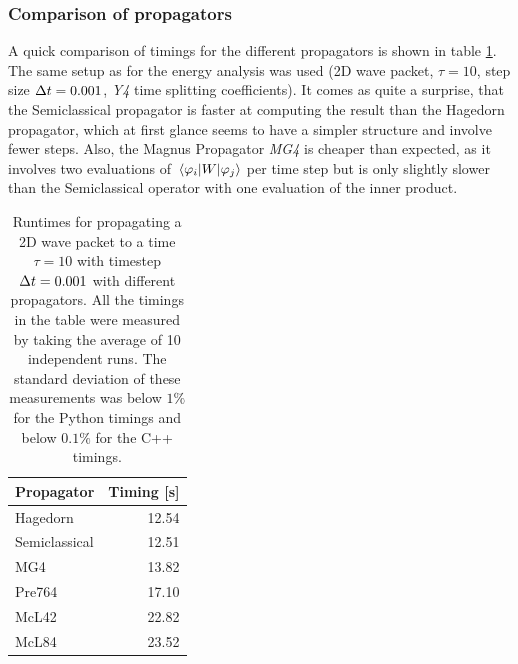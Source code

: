 \subsubsection{Comparison of propagators}
%
A quick comparison of timings for the different propagators is shown in table \ref{tab:comparison}.
The same setup as for the energy analysis was used (2D wave packet, $\tau = 10$, step size $\Delta t = 0.001$, \emph{Y4} time splitting coefficients).
It comes as quite a surprise, that the Semiclassical propagator is faster at computing the result than the Hagedorn propagator, which at first glance seems to have  a simpler structure and involve fewer steps.
Also, the Magnus Propagator \emph{MG4} is cheaper than expected, as it involves two evaluations of $\matrixel{\varphi_i}{W}{\varphi_j}$ per time step but is only slightly slower than the Semiclassical operator with one evaluation of the inner product.
%
\begin{table}[h]
	\centering
	\begin{tabular}{|l | r |} 
		\hline
		\multicolumn{1}{|c}{\textbf{Propagator}} &
		\multicolumn{1}{|c|}{\textbf{Timing [s]}} \\
		\hline
		Hagedorn & 12.54 \\
		Semiclassical & 12.51 \\
		MG4 & 13.82 \\
		Pre764 & 17.10 \\
		McL42 & 22.82 \\
		McL84 & 23.52 \\
		\hline
	\end{tabular}
	\label{tab:comparison}
	\caption{Runtimes for propagating a 2D wave packet to a time $\tau = 10$ with timestep $\Delta t = 0.001$ with different propagators. All the timings in the table were measured by taking the average of 10 independent runs. The standard deviation of these measurements was below $1\%$ for the Python timings and below $0.1\%$ for the C++ timings.}
\end{table}


